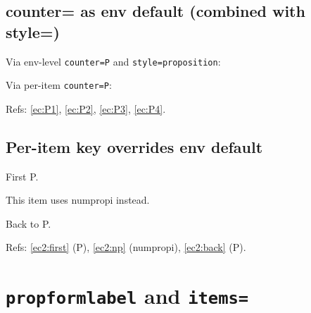\documentclass{article}
\begin{document}
\subsection{counter= as env default (combined with style=)}


Via env-level \texttt{counter=P} and \texttt{style=proposition}:
\begin{prop}[style=proposition, counter=P]
  \item \label{ec:P1}  %
  \item \label{ec:P2}
\end{prop}

Via per-item \texttt{counter=P}:
\begin{prop}
  \item[counter=P] \label{ec:P3}
  \item[counter=P] \label{ec:P4}
\end{prop}

Refs: \ref{ec:P1}, \ref{ec:P2}, \ref{ec:P3}, \ref{ec:P4}.

\subsection{Per-item key overrides env default}

\begin{prop}[style=proposition, counter=P]
  \item First P. \label{ec2:first}
  \item[counter=numpropi] This item uses numpropi instead. \label{ec2:np}
  \item Back to P. \label{ec2:back}
\end{prop}

Refs: \ref{ec2:first} (P), \ref{ec2:np} (numpropi), \ref{ec2:back} (P).

\section{\texttt{propformlabel} and \texttt{items=}}

%
%
\end{document}
